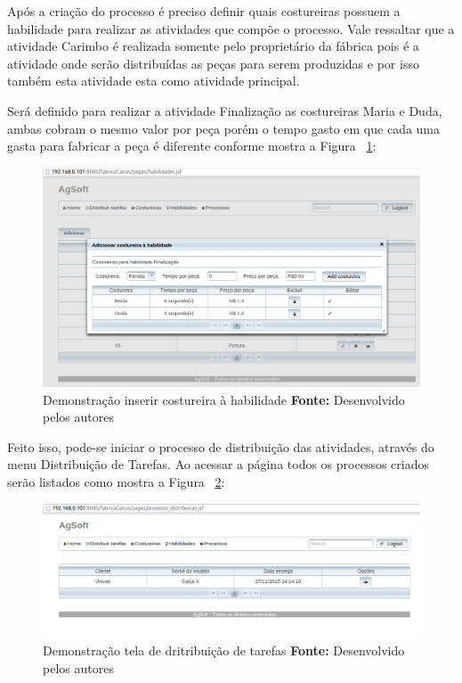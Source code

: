 \par Após a criação do processo é preciso definir quais costureiras possuem a
habilidade para realizar as atividades que compõe o processo. Vale ressaltar que
a atividade Carimbo é realizada somente pelo proprietário da fábrica pois é a
atividade onde serão distribuídas as peças para serem produzidas e por isso
também esta atividade esta como atividade principal.

\par Será definido para realizar a atividade Finalização as costureiras
Maria e Duda, ambas cobram o mesmo valor por peça porém o tempo
gasto em que cada uma gasta para fabricar a peça é diferente conforme mostra
a Figura ~\ref{fig:costureira_habilidade}:

\newpage

\begin{figure}[h!]
	\centerline{\includegraphics[scale=0.4]{./imagens/tela_habilidade_teste1.png}}
	\caption[Demonstração inserir costureira à habilidade]
	{Demonstração inserir costureira à habilidade \textbf{Fonte:} Desenvolvido pelos autores}
	\label{fig:costureira_habilidade}
\end{figure}


\par Feito isso, pode-se iniciar o processo de distribuição
das atividades, através do menu Distribuição de Tarefas.
Ao acessar a página todos os processos criados serão
listados como mostra a Figura ~\ref{fig:distribuicao_tarefas}:

\begin{figure}[h!]
	\centerline{\includegraphics[scale=0.4]{./imagens/tela_distribuicao_tarefas.png}}
	\caption[Demonstração tela de dritribuição de tarefas]
	{Demonstração tela de dritribuição de tarefas \textbf{Fonte:} Desenvolvido pelos autores}
	\label{fig:distribuicao_tarefas}
\end{figure}


